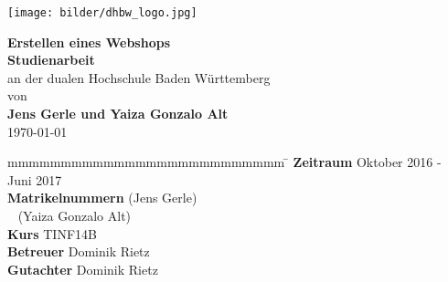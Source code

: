 \begin{titlepage}
	\centering
	\texttt{[image: bilder/dhbw\_logo.jpg]}
	\enlargethispage{20mm}
	\begin{center}
		\vspace*{12mm}	{\LARGE\textbf{Erstellen eines Webshops} }\\
		\vspace*{12mm}	{\large\textbf{Studienarbeit}}\\
		\vspace*{3mm}	an der dualen Hochschule Baden Württemberg\\
		\vspace*{3mm}	von\\
		\vspace*{3mm}	{\large\textbf{Jens Gerle und Yaiza Gonzalo Alt}}\\
		\vspace*{12mm}	\today\\
	\end{center}
	\vspace*{65mm}
	\begin{spacing}{1.2}
		\begin{tabbing}
			mmmmmmmmmmmmmmmmmmmmmmmmmm             \= \kill
			\textbf{Zeitraum}       			\>  Oktober 2016 - Juni 2017\\
			\textbf{Matrikelnummern}			 (Jens Gerle)	\\
									~			 (Yaiza Gonzalo Alt)\\
			\textbf{Kurs}  						\>  TINF14B\\
			\textbf{Betreuer}       			\>  Dominik Rietz\\
			\textbf{Gutachter}      			\>  Dominik Rietz
		\end{tabbing}
	\end{spacing}
\end{titlepage}
